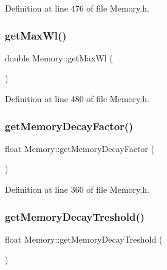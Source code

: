 Definition at line 476 of file Memory.\+h.

\mbox{\label{class_memory_ada2689cdc85e2429579c0e8a75b63b8b}} 
\subsubsection{\texorpdfstring{get\+Max\+Wl()}{getMaxWl()}}
{\footnotesize\ttfamily double Memory\+::get\+Max\+Wl (\begin{DoxyParamCaption}{ }\end{DoxyParamCaption})\hspace{0.3cm}{\ttfamily [inline]}}



Definition at line 480 of file Memory.\+h.

\mbox{\label{class_memory_a03d6c9fa9594c8385bfe30a4c6253757}} 
\subsubsection{\texorpdfstring{get\+Memory\+Decay\+Factor()}{getMemoryDecayFactor()}}
{\footnotesize\ttfamily float Memory\+::get\+Memory\+Decay\+Factor (\begin{DoxyParamCaption}{ }\end{DoxyParamCaption})\hspace{0.3cm}{\ttfamily [inline]}}



Definition at line 360 of file Memory.\+h.

\mbox{\label{class_memory_ada0d9f016a8913fd6ca9c959c3a7f49a}} 
\subsubsection{\texorpdfstring{get\+Memory\+Decay\+Treshold()}{getMemoryDecayTreshold()}}
{\footnotesize\ttfamily float Memory\+::get\+Memory\+Decay\+Treshold (\begin{DoxyParamCaption}{ }\end{DoxyParamCaption})\hspace{0.3cm}{\ttfamily [inline]}}



